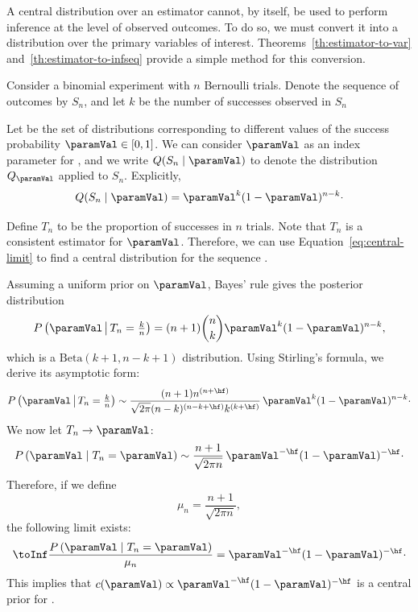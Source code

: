 A central distribution over an estimator cannot, by itself, be used to perform inference at the level of observed
outcomes.
To do so, we must convert it into a distribution over the primary variables of interest.
Theorems~\ref{th:estimator-to-var} and~\ref{th:estimator-to-infseq} provide a simple
method for this conversion.

\begin{example}
    \newcommand{\pv}{\paramVal}
    Consider a binomial experiment with $n$ Bernoulli trials.
    Denote the sequence of outcomes by $S_n$, and let $k$ be the number of successes observed in $S_n$

    Let \setQ be the set of distributions corresponding to different values of the success
    probability $\pv \in [0,1]$.
    We can consider $\pv$ as an index parameter for \setQ, and
    we write $Q(S_n \mid \pv)$ to denote the distribution $Q_{\pv}$ applied to $S_n$.
    Explicitly,
    \[
        Q(S_n \mid \pv) = \pv^k (1-\pv)^{n-k} \cdot
    \]

    Define $T_n$ to be the proportion of successes in $n$ trials.
    Note that $T_n$ is a consistent estimator for $\pv$.
    Therefore, we can use Equation~\ref{eq:central-limit} to find a central distribution for the sequence
    .

    Assuming a uniform prior on $\pv$, Bayes’ rule gives the posterior distribution
    \[
        P\left( \pv \, \middle| \, T_n = \tfrac{k}{n} \right) = (n+1)\binom{n}{k} \pv^k (1 - \pv)^{n - k},
    \]
    which is a $\mathrm{Beta}(k+1, n-k+1)$ distribution.
    Using Stirling’s formula, we derive its asymptotic form:
    \begin{equation*}
        P\left( \pv \, \middle| \, T_n = \tfrac{k}{n} \right) \sim
        \frac{(n+1)n^{(n+\hf)}}{\sqrt{2 \pi} (n-k)^{(n-k+\hf)} k^{(k+\hf)}} \, \pv^k (1 - \pv)^{n - k} \cdot
    \end{equation*}
    We now let $T_n \to \pv$:
    \begin{equation*}
        P\left(\pv \mid T_n = \pv \right) \sim \frac{n+1}{\sqrt{2 \pi n}} \, \pv^{-\hf}(1 - \pv)^{-\hf} \cdot
    \end{equation*}
    Therefore, if we define
    \[
        \mu_n = \frac{n+1}{\sqrt{2 \pi n}},
    \]
    the following limit exists:
    \[
        \toInf \frac{P\left(\pv \mid T_n = \pv \right)}{\mu_n} = \pv^{-\hf}(1 - \pv)^{-\hf} \cdot
    \]
    This implies that $c(\pv) \propto \pv^{-\hf}(1 - \pv)^{-\hf}$ is a central prior for .


\end{example}

